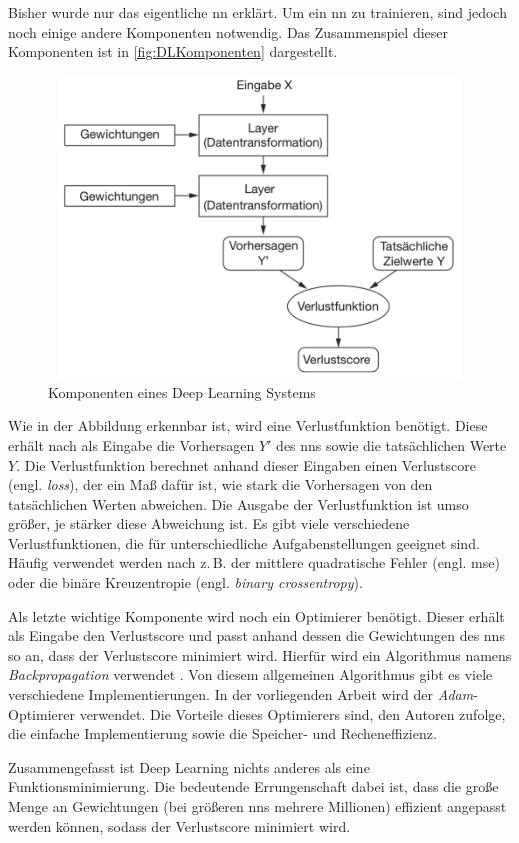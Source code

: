 Bisher wurde nur das eigentliche \acrshort{nn} erklärt.
Um ein \acrshort{nn} zu trainieren, sind jedoch noch einige andere Komponenten notwendig.
Das Zusammenspiel dieser Komponenten ist in \autoref{fig:DLKomponenten} dargestellt.
\begin{figure}[h]
    \centering
    \includegraphics[width=1\textwidth,height=8cm,keepaspectratio=true]{content/images/DeepLearningKomponenten.png}
    \caption{Komponenten eines Deep Learning Systems \cite[Abb. 1.9]{DeepLearningPythonKeras}}
    \label{fig:DLKomponenten}
\end{figure}
Wie in der Abbildung erkennbar ist, wird eine Verlustfunktion benötigt.
Diese erhält nach \cite[S. 30]{DeepLearningPythonKeras} als Eingabe die Vorhersagen $Y'$ des \acrshort{nn}s sowie die tatsächlichen Werte $Y$.
Die Verlustfunktion berechnet anhand dieser Eingaben einen Verlustscore (engl. \emph{loss}), der ein Maß dafür ist, wie stark die Vorhersagen von den tatsächlichen Werten abweichen.
Die Ausgabe der Verlustfunktion ist umso größer, je stärker diese Abweichung ist.
Es gibt viele verschiedene Verlustfunktionen, die für unterschiedliche Aufgabenstellungen geeignet sind.
Häufig verwendet werden nach \cite[S. 155]{DeepLearningPythonKeras} z.\,B. der mittlere quadratische Fehler (engl. \acrfull{mse}) oder die binäre Kreuzentropie (engl. \emph{binary crossentropy}).

Als letzte wichtige Komponente wird noch ein Optimierer benötigt.
Dieser erhält als Eingabe den Verlustscore und passt anhand dessen die Gewichtungen des \acrshort{nn}s so an, dass der Verlustscore minimiert wird.
Hierfür wird ein Algorithmus namens \emph{Backpropagation} verwendet \cite[S. 30]{DeepLearningPythonKeras}.
Von diesem allgemeinen Algorithmus gibt es viele verschiedene Implementierungen.
In der vorliegenden Arbeit wird der \emph{Adam}-Optimierer \cite{AdamPaper} verwendet.
Die Vorteile dieses Optimierers sind, den Autoren zufolge, die einfache Implementierung sowie die Speicher- und Recheneffizienz.

Zusammengefasst ist Deep Learning nichts anderes als eine Funktionsminimierung.
Die bedeutende Errungenschaft dabei ist, dass die große Menge an Gewichtungen (bei größeren \acrshort{nn}s mehrere Millionen) effizient angepasst werden können, sodass der Verlustscore minimiert wird.

